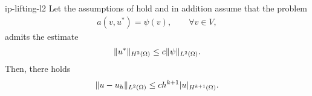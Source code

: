 \begin{Theorem}{ip-lifting-l2}
  Let the assumptions of  hold and in
  addition assume that the problem
  \begin{gather*}
    a(v,u^*) = \psi(v),\qquad\forall v\in V,
  \end{gather*}
  admits the  estimate
  \begin{gather}
    \label{eq:ip-lifting:12}
    \lVert u^*\rVert_{H^2(\Omega)} \le c \lVert\psi\rVert_{L^2(\Omega)}.
  \end{gather}
  Then, there holds
  \begin{gather}
    \label{eq:ip-lifting:13}
    \lVert u-u_h\rVert_{L^2(\Omega)} \le c h^{k+1} \lvert u\rvert_{H^{k+1}(\Omega)}.
  \end{gather}
\end{Theorem}


